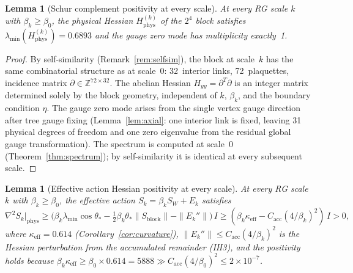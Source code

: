 \documentclass[11pt]{article}
\newtheorem{lemma}[theorem]{Lemma}
\theoremstyle{definition}
\newcommand{\Z}{\mathbb{Z}}
\begin{document}
\begin{lemma}[Schur complement positivity at every scale]%
\label{lem:schur-every-scale}
At every RG scale $k$ with $\beta_k\ge\beta_0$, the physical
Hessian $H_{\mathrm{phys}}^{(k)}$ of the $2^4$ block satisfies
$\lambda_{\min}(H_{\mathrm{phys}}^{(k)})=0.6893$ and the
gauge zero mode has multiplicity exactly~1.
\end{lemma}

\begin{proof}
By self-similarity (Remark~\ref{rem:selfsim}), the block at
scale~$k$ has the same combinatorial structure as at
scale~0: 32~interior links, 72~plaquettes, incidence matrix
$\partial\in\Z^{72\times 32}$.  The abelian Hessian
$H_{yy}=\partial^T\partial$ is an integer matrix
determined solely by the block geometry, independent of $k$,
$\beta_k$, and the boundary condition $\eta$.
The gauge zero mode arises from the single vertex gauge
direction after tree gauge fixing
(Lemma~\ref{lem:axial}: one interior link is fixed,
leaving 31 physical degrees of freedom and one zero eigenvalue
from the residual global gauge transformation).
The spectrum is computed at scale~0
(Theorem~\ref{thm:spectrum}); by self-similarity it is
identical at every subsequent scale.
\end{proof}

\begin{lemma}[Effective action Hessian positivity at every scale]%
\label{lem:eff-hessian}
At every RG scale $k$ with $\beta_k\ge\beta_0$, the effective
action $S_k=\beta_k S_W+E_k$ satisfies
\begin{equation}
\nabla^2 S_k\big|_{\mathrm{phys}}
\ge\bigl(\beta_k\lambda_{\min}\cos\theta_*
-\tfrac{1}{2}\beta_k\theta_*\|S_{\mathrm{block}}\|
-\|E_k''\|\bigr)\,I
\ge(\beta_k\kappa_{\mathrm{eff}}-C_{\mathrm{acc}}(4/\beta_k)^2)\,I
>0,
\end{equation}
where $\kappa_{\mathrm{eff}}=0.614$ (Corollary~\ref{cor:curvature}),
$\|E_k''\|\le C_{\mathrm{acc}}(4/\beta_k)^2$
is the Hessian perturbation from the accumulated remainder
(IH3), and the positivity holds because
$\beta_k\kappa_{\mathrm{eff}}\ge\beta_0\times 0.614=5888
\gg C_{\mathrm{acc}}(4/\beta_0)^2\le 2\times 10^{-7}$.
\end{lemma}
\end{document}
